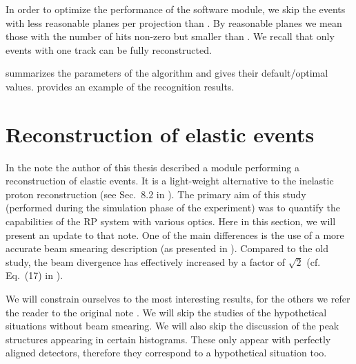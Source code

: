 
In order to optimize the performance of the software module, we skip the events with less reasonable planes per projection than . By reasonable planes we mean those with the number of hits non-zero but smaller than . We recall that only events with one track can be fully reconstructed.

 summarizes the parameters of the algorithm and gives their default/optimal values.  provides an example of the recognition results.



\section[elr]{Reconstruction of elastic events}

In the note  the author of this thesis described a module performing a reconstruction of elastic events. It is a light-weight alternative to the inelastic proton reconstruction (see Sec.~8.2 in ). The primary aim of this study (performed during the simulation phase of the experiment) was to quantify the capabilities of the RP system with various optics. Here in this section, we will present an update to that note. One of the main differences is the use of a more accurate beam smearing description (as presented in ). Compared to the old study, the beam divergence has effectively increased by a factor of $\sqrt 2$ (cf. Eq.~(17) in ).

We will constrain ourselves to the most interesting results, for the others we refer the reader to the original note . We will skip the studies of the hypothetical situations without beam smearing. We will also skip the discussion of the peak structures appearing in certain histograms. These only appear with perfectly aligned detectors, therefore they correspond to a hypothetical situation too.

